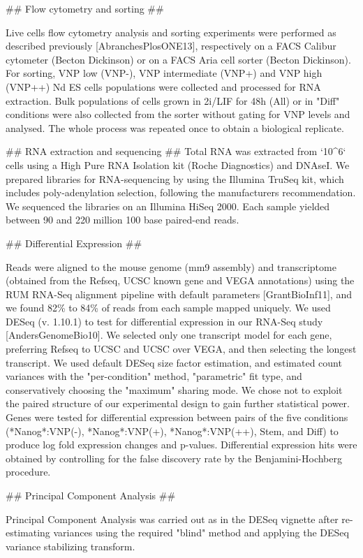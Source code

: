 \documentclass[aps,prl,twocolumn,superscriptaddress]{revtex4}
\begin{document}
## Flow cytometry and sorting ##

Live cells flow cytometry analysis and sorting experiments were performed as described previously [AbranchesPlosONE13], respectively on a FACS Calibur cytometer (Becton Dickinson) or on a FACS Aria cell sorter (Becton Dickinson). For sorting, VNP low (VNP-), VNP intermediate (VNP+) and VNP high (VNP++) Nd ES cells populations were collected and processed for RNA extraction. Bulk populations of cells grown in 2i/LIF for 48h (All) or in "Diff" conditions were also collected from the sorter without gating for VNP levels and analysed. The whole process was repeated once to obtain a biological replicate. 

## RNA extraction and sequencing ##
Total RNA was extracted from `10^6` cells using a High Pure RNA Isolation kit (Roche Diagnostics) and DNAseI. We prepared libraries for RNA-sequencing by using the Illumina TruSeq kit, which includes poly-adenylation selection, following the manufacturers recommendation. We sequenced the libraries on an Illumina HiSeq 2000. Each sample yielded between 90 and 220 million 100 base paired-end reads.


## Differential Expression ##

Reads were aligned to the mouse genome (mm9 assembly) and transcriptome (obtained from the Refseq, UCSC known gene and VEGA annotations) using the RUM RNA-Seq alignment pipeline with default parameters [GrantBioInf11], and we found 82\% to 84\% of reads from each sample mapped uniquely. We used DESeq (v. 1.10.1) to test for differential expression in our RNA-Seq study [AndersGenomeBio10]. 
We selected only one transcript model for each gene, preferring Refseq to UCSC and UCSC over VEGA, and then selecting the longest transcript. We used default DESeq size factor estimation, and estimated count variances with the "per-condition" method, "parametric" fit type, and conservatively choosing the "maximum" sharing mode. We chose not to exploit the paired structure of our experimental design to gain further statistical power. Genes were tested for differential expression between pairs of the five conditions (*Nanog*:VNP(-), *Nanog*:VNP(+), *Nanog*:VNP(++), Stem, and Diff) to produce log fold expression changes and p-values.  Differential expression hits were obtained by controlling for the false discovery rate by the Benjamini-Hochberg procedure.

## Principal Component Analysis ##

Principal Component Analysis was carried out as in the DESeq vignette after re-estimating variances using the required "blind" method and applying the DESeq variance stabilizing transform. 
\end{document}
